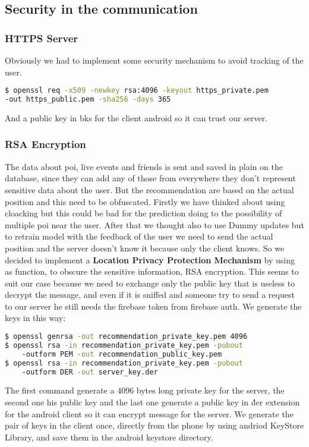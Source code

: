 \documentclass[../../main]{subfiles}
\begin{document}
\subsection{Security in the communication}
\subsubsection*{HTTPS Server}
Obviously we had to implement some security mechanism to avoid tracking of the user.\\
\begin{lstlisting}[language=bash]
$ openssl req -x509 -newkey rsa:4096 -keyout https_private.pem 
-out https_public.pem -sha256 -days 365
\end{lstlisting}
And a public key in bks for the client android so it can trust our server.

\subsubsection*{RSA Encryption}
The data about poi, live events and friends is sent and saved in plain on the database, since they can add any of those from everywhere they don't represent sensitive data about the user.
But the recommendation are based on the actual position and this need to be obfuscated.
Firstly we have thinked about using cloacking but this could be bad for the prediction doing to the possibility of multiple poi near the user.
After that we thought also to use Dummy updates but to retrain model with the feedback of the user we need to send the actual position and the server doesn't know it because only the client knows.
So we decided to implement a \textbf{Location Privacy Protection Mechanism} by using as function, to obscure the sensitive information, RSA encryption.
This seems to suit our case because we need to exchange only the public key that is useless to decrypt the message, and even if it is sniffed and someone try to send a request to our server he still needs the firebase token from firebase auth.
\noindent We generate the keys in this way:
\begin{lstlisting}[language=bash]
$ openssl genrsa -out recommendation_private_key.pem 4096
$ openssl rsa -in recommendation_private_key.pem -pubout 
    -outform PEM -out recommendation_public_key.pem 
$ openssl rsa -in recommendation_private_key.pem -pubout 
    -outform DER -out server_key.der
\end{lstlisting}
The first command generate a 4096 bytes long private key for the server, the second one his public key and the last one generate a public key in \.der extension for the android client so it can encrypt message for the server.
We generate the pair of keys in the client once, directly from the phone by using andriod KeyStore Library, and save them in the android keystore directory.
\end{document}

